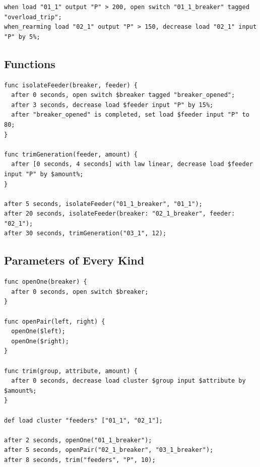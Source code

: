 \documentclass[12pt]{article}
\begin{document}
\begin{lstlisting}
when load "01_1" output "P" > 200, open switch "01_1_breaker" tagged "overload_trip";
when_rearming load "02_1" output "P" > 150, decrease load "02_1" input "P" by 5%;
\end{lstlisting}

\subsection{Functions}

\begin{lstlisting}
func isolateFeeder(breaker, feeder) {
  after 0 seconds, open switch $breaker tagged "breaker_opened";
  after 3 seconds, decrease load $feeder input "P" by 15%;
  after "breaker_opened" is completed, set load $feeder input "P" to 80;
}

func trimGeneration(feeder, amount) {
  after [0 seconds, 4 seconds] with law linear, decrease load $feeder input "P" by $amount%;
}

after 5 seconds, isolateFeeder("01_1_breaker", "01_1");
after 20 seconds, isolateFeeder(breaker: "02_1_breaker", feeder: "02_1");
after 30 seconds, trimGeneration("03_1", 12);
\end{lstlisting}

\subsection{Parameters of Every Kind}

\begin{lstlisting}
func openOne(breaker) {
  after 0 seconds, open switch $breaker;
}

func openPair(left, right) {
  openOne($left);
  openOne($right);
}

func trim(group, attribute, amount) {
  after 0 seconds, decrease load cluster $group input $attribute by $amount%;
}

def load cluster "feeders" ["01_1", "02_1"];

after 2 seconds, openOne("01_1_breaker");
after 5 seconds, openPair("02_1_breaker", "03_1_breaker");
after 8 seconds, trim("feeders", "P", 10);
\end{lstlisting}
\end{document}

